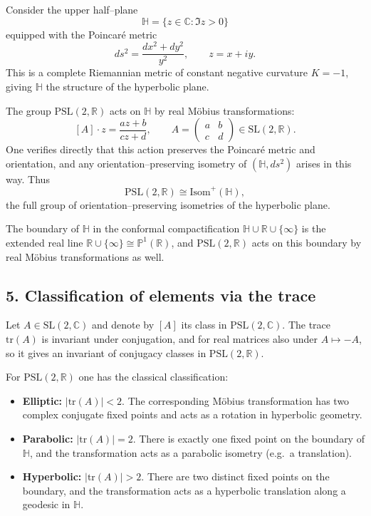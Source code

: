 \documentclass[12pt,a4paper]{article}
\theoremstyle{plain}
\theoremstyle{definition}      %
\begin{document}
Consider the upper half–plane
\[
\mathbb{H}
= \{ z\in\mathbb{C} : \Im z > 0\}
\]
equipped with the Poincaré metric
\[
ds^{2} = \frac{dx^{2} + dy^{2}}{y^{2}},
\qquad z=x+iy.
\]
This is a complete Riemannian metric of constant negative curvature
$K=-1$, giving $\mathbb{H}$ the structure of the hyperbolic plane.

The group $\mathrm{PSL}(2,\mathbb{R})$ acts on $\mathbb{H}$ by real Möbius
transformations:
\[
[A]\cdot z = \frac{az+b}{cz+d},
\qquad
A=
\begin{pmatrix}
	a & b\\ c & d
\end{pmatrix}
\in \mathrm{SL}(2,\mathbb{R}).
\]
One verifies directly that this action preserves the Poincaré metric and
orientation, and any orientation–preserving isometry of $(\mathbb{H},ds^{2})$
arises in this way.  Thus
\[
\mathrm{PSL}(2,\mathbb{R})
\cong \mathrm{Isom}^{+}(\mathbb{H}),
\]
the full group of orientation–preserving isometries of the hyperbolic plane.

The boundary of $\mathbb{H}$ in the conformal compactification
$\mathbb{H}\cup\mathbb{R}\cup\{\infty\}$ is the extended real line
$\mathbb{R}\cup\{\infty\}\cong\mathbb{P}^{1}(\mathbb{R})$, and
$\mathrm{PSL}(2,\mathbb{R})$ acts on this boundary by real Möbius
transformations as well.

\subsection*{5. Classification of elements via the trace}

Let $A\in\mathrm{SL}(2,\mathbb{C})$ and denote by $[A]$ its class in
$\mathrm{PSL}(2,\mathbb{C})$.  The trace $\mathrm{tr}(A)$ is invariant under
conjugation, and for real matrices also under $A\mapsto -A$, so it gives an
invariant of conjugacy classes in $\mathrm{PSL}(2,\mathbb{R})$.

For $\mathrm{PSL}(2,\mathbb{R})$ one has the classical classification:

\begin{itemize}
	\item \textbf{Elliptic:}
	$|\mathrm{tr}(A)|<2$.  The corresponding Möbius transformation has two
	complex conjugate fixed points and acts as a rotation in hyperbolic
	geometry.
	\item \textbf{Parabolic:}
	$|\mathrm{tr}(A)|=2$.  There is exactly one fixed point on the boundary
	of $\mathbb{H}$, and the transformation acts as a parabolic isometry
	(e.g.\ a translation).
	\item \textbf{Hyperbolic:}
	$|\mathrm{tr}(A)|>2$.  There are two distinct fixed points on the
	boundary, and the transformation acts as a hyperbolic translation along
	a geodesic in $\mathbb{H}$.
\end{itemize}
\end{document}
